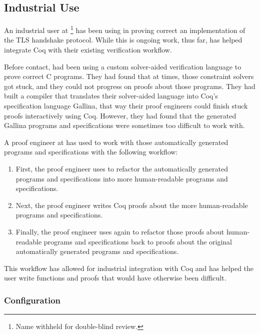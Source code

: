 \subsection{Industrial Use}
\label{sec:industry}

An industrial user at \company\footnote{Name withheld for double-blind review.} has been using \toolname in proving
correct an implementation of the TLS handshake protocol.
While this is ongoing work, thus far,
\toolname has helped \company integrate Coq with their existing verification workflow.

Before contact, \company had been using a custom solver-aided verification language to prove correct C programs.
They had found that at times, those constraint solvers got stuck, and they could not
progress on proofs about those programs.
They had built a compiler that translates their solver-aided language into Coq's specification language Gallina,
that way their proof engineers could finish stuck proofs interactively using Coq.
However, they had found that the generated Gallina programs and specifications were sometimes too difficult to work with.

A proof engineer at \company has used \toolname to work with those automatically generated programs and specifications
with the following workflow:

\begin{enumerate}
\item First, the proof engineer uses \toolname to refactor the automatically generated programs and specifications into more
human-readable programs and specifications.
\item Next, the proof engineer writes Coq proofs about the more human-readable programs and specifications.
\item Finally, the proof engineer uses \toolname again to refactor those proofs about human-readable programs and specifications back to
proofs about the original automatically generated programs and specifications.
\end{enumerate}
This workflow has allowed for industrial integration with Coq and has helped the user write functions and proofs
that would have otherwise been difficult.


\subsubsection{Configuration}


